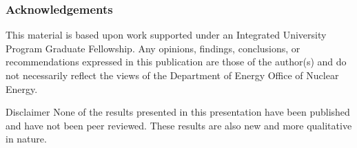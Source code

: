 \begin{frame}
    \frametitle{Acknowledgements}
    This material is based upon work supported under an Integrated University 
Program Graduate Fellowship. Any opinions, findings, conclusions, or 
recommendations expressed in this publication are those of the author(s) 
and do not necessarily reflect the views of the Department of Energy Office 
of Nuclear Energy.

    \begin{block}{Disclaimer}
        None of the results presented in this presentation have been 
        published and have not been peer reviewed. These results are 
        also new and more qualitative in nature. 
        
    \end{block}

\end{frame}